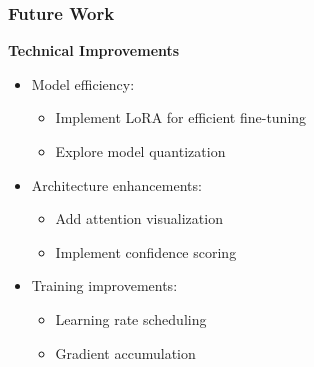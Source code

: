\documentclass{beamer}
\begin{document}
\begin{frame}
\frametitle{Future Work}
\textbf{Technical Improvements}
\begin{itemize}
  \item Model efficiency:
  \begin{itemize}
    \item Implement LoRA for efficient fine-tuning
    \item Explore model quantization
  \end{itemize}
  \item Architecture enhancements:
  \begin{itemize}
    \item Add attention visualization
    \item Implement confidence scoring
  \end{itemize}
  \item Training improvements:
  \begin{itemize}
    \item Learning rate scheduling
    \item Gradient accumulation
  \end{itemize}
\end{itemize}
\end{frame}
\end{document}
